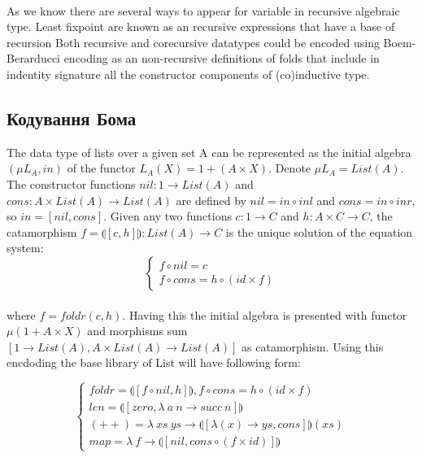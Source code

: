   \paragraph{}
  As we know there are several ways to appear for variable in recursive algebraic type.
  Least fixpoint are known as an recursive expressions that have a base of recursion
  Both recursive and corecursive datatypes could be encoded using Boem-Berarducci encoding
  as an non-recursive definitions of folds that include in indentity signature all the
  constructor components of (co)inductive type.

  \subsection{Кодування Бома}
  The data type of lists over a given set A can be represented as the initial algebra
  $(\mu L_A, in)$ of the functor $L_A(X) = 1 + (A \times X)$. Denote $\mu L_A = List(A)$.
  The constructor functions $nil: 1 \rightarrow List(A)$ and
  $cons: A \times List(A) \rightarrow List(A)$ are defined by
  $nil = in \circ inl$ and $cons = in \circ inr$, so $in = [nil,cons]$.
  Given any two functions $c: 1 \rightarrow C$ and $h: A \times C \rightarrow C$,
  the catamorphism $f = \llparenthesis [c,h] \rrparenthesis : List(A) \rightarrow C$
  is the unique solution of the equation system:
\vspace{0.3cm}
$$
\begin{cases}
  f \circ nil  = c \\
  f \circ cons = h \circ (id \times f)
\end{cases}
$$

\paragraph{}
  where $f = foldr(c,h)$. Having this the initial algebra is presented with functor
  $\mu (1 + A \times X)$ and morphisms sum $[1 \rightarrow List(A), A \times List(A) \rightarrow List(A)]$
  as catamorphism. Using this encdoding the base library of List will have following form:

\vspace{0.5cm}
$$
\begin{cases}
 foldr = \llparenthesis [ f \circ nil , h] \rrparenthesis, f \circ cons = h \circ (id \times f)\\
 len = \llparenthesis [ zero, \lambda\ a\ n \rightarrow succ\ n ] \rrparenthesis \\
 (++) = \lambda\ xs\ ys \rightarrow \llparenthesis [ \lambda (x) \rightarrow ys, cons ] \rrparenthesis (xs) \\
 map = \lambda\ f \rightarrow \llparenthesis [ nil, cons \circ (f \times id)] \rrparenthesis
\end{cases}
$$

